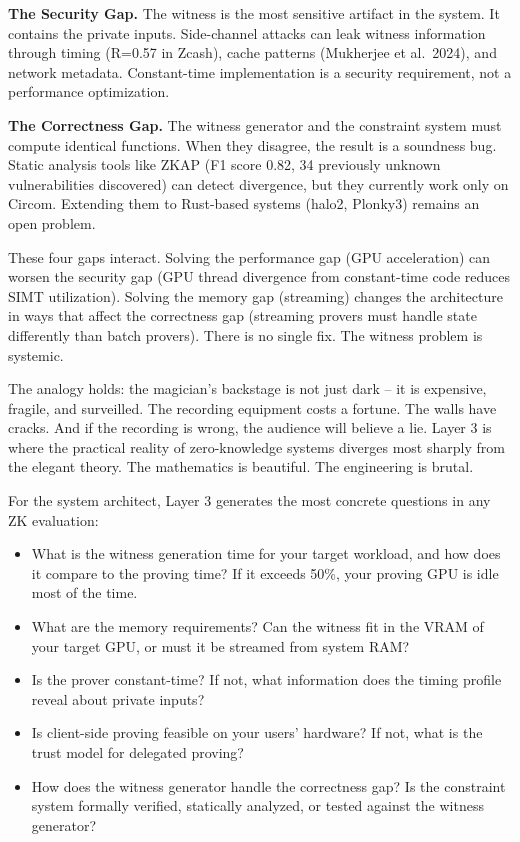 \documentclass[
  11pt,
  openany]{report}
\providecommand{\tightlist}{%
  \setlength{\itemsep}{0pt}\setlength{\parskip}{0pt}}
\renewcommand{\textbf}[1]{{\bfseries\color{MidnightBold}#1}}
\begin{document}
\textbf{The Security Gap.} The witness is the most sensitive artifact in the
system. It contains the private inputs. Side-channel attacks can leak witness
information through timing (R=0.57 in Zcash), cache patterns (Mukherjee et
al.~2024), and network metadata. Constant-time implementation is a security
requirement, not a performance optimization.

\textbf{The Correctness Gap.} The witness generator and the constraint system
must compute identical functions. When they disagree, the result is a soundness
bug. Static analysis tools like ZKAP (F1 score 0.82, 34 previously unknown
vulnerabilities discovered) can detect divergence, but they currently work only
on Circom. Extending them to Rust-based systems (halo2, Plonky3) remains an open
problem.

These four gaps interact. Solving the performance gap (GPU acceleration) can
worsen the security gap (GPU thread divergence from constant-time code reduces
SIMT utilization). Solving the memory gap (streaming) changes the architecture
in ways that affect the correctness gap (streaming provers must handle state
differently than batch provers). There is no single fix. The witness problem is
systemic.

The analogy holds: the magician's backstage is not just dark -- it is expensive,
fragile, and surveilled. The recording equipment costs a fortune. The walls have
cracks. And if the recording is wrong, the audience will believe a lie. Layer 3
is where the practical reality of zero-knowledge systems diverges most sharply
from the elegant theory. The mathematics is beautiful. The engineering is
brutal.

For the system architect, Layer 3 generates the most concrete questions in any
ZK evaluation:

\begin{itemize}
\tightlist
\item
  What is the witness generation time for your target workload, and how does it
  compare to the proving time? If it exceeds 50\%, your proving GPU is idle most
  of the time.
\item
  What are the memory requirements? Can the witness fit in the VRAM of your
  target GPU, or must it be streamed from system RAM?
\item
  Is the prover constant-time? If not, what information does the timing profile
  reveal about private inputs?
\item
  Is client-side proving feasible on your users' hardware? If not, what is the
  trust model for delegated proving?
\item
  How does the witness generator handle the correctness gap? Is the constraint
  system formally verified, statically analyzed, or tested against the witness
  generator?
\end{itemize}
\end{document}
